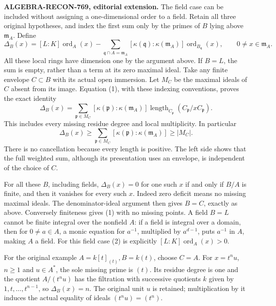 \textbf{ALGEBRA-\AlgebraIdentifierBreak{}RECON-\AlgebraIdentifierBreak{}769, editorial extension.} The field case can be included without assigning a one-dimensional order to a field. Retain all three original hypotheses, and index the first sum only by the primes of \(B\) lying above \(\mathfrak m_A\). Define \[
 \Delta_B(x)
 =
 [L:K]\operatorname{ord}_A(x)
 -
 \sum_{\mathfrak q\cap A=\mathfrak m_A}
       [\kappa(\mathfrak q):\kappa(\mathfrak m_A)]
       \operatorname{ord}_{B_{\mathfrak q}}(x),
 \qquad 0\ne x\in\mathfrak m_A.
 \tag{2}
\] All these local rings have dimension one by the argument above. If \(B=L\), the sum is empty, rather than a term at its zero maximal ideal. Take any finite envelope \(C\subset B\) with its actual open immersion. Let \(M_C\) be the maximal ideals of \(C\) absent from its image. Equation (1), with these indexing conventions, proves the exact identity \[
 \Delta_B(x)=
 \sum_{\mathfrak p\in M_C}
     [\kappa(\mathfrak p):\kappa(\mathfrak m_A)]
     \operatorname{length}_{C_{\mathfrak p}}
                          (C_{\mathfrak p}/xC_{\mathfrak p}).
 \tag{3}
\] This includes every missing residue degree and local multiplicity. In particular \[
 \Delta_B(x)\geq
 \sum_{\mathfrak p\in M_C}
       [\kappa(\mathfrak p):\kappa(\mathfrak m_A)]
 \geq |M_C|.
\] There is no cancellation because every length is positive. The left side shows that the full weighted sum, although its presentation uses an envelope, is independent of the choice of \(C\).

For all these \(B\), including fields, \(\Delta_B(x)=0\) for one such \(x\) if and only if \(B/A\) is finite, and then it vanishes for every such \(x\). Indeed zero deficit means no missing maximal ideals. The denominator-ideal argument then gives \(B=C\), exactly as above. Conversely finiteness gives (1) with no missing points. A field \(B=L\) cannot be finite integral over the nonfield \(A\): if a field is integral over a domain, then for \(0\ne a\in A\), a monic equation for \(a^{-1}\), multiplied by \(a^{d-1}\), puts \(a^{-1}\) in \(A\), making \(A\) a field. For this field case (2) is explicitly \([L:K]\operatorname{ord}_A(x)>0\).

For the original example \(A=k[t]_{(t)}, B=k(t)\), choose \(C=A\). For \(x=t^n u\), \(n\geq1\) and \(u\in A^*\), the sole missing prime is \((t)\). Its residue degree is one and the quotient \(A/(t^n u)\) has the filtration with successive quotients \(k\) given by \(1,t,\ldots,t^{n-1}\), so \(\Delta_B(x)=n\). The original unit \(u\) is retained; multiplication by it induces the actual equality of ideals \((t^n u)=(t^n)\).

